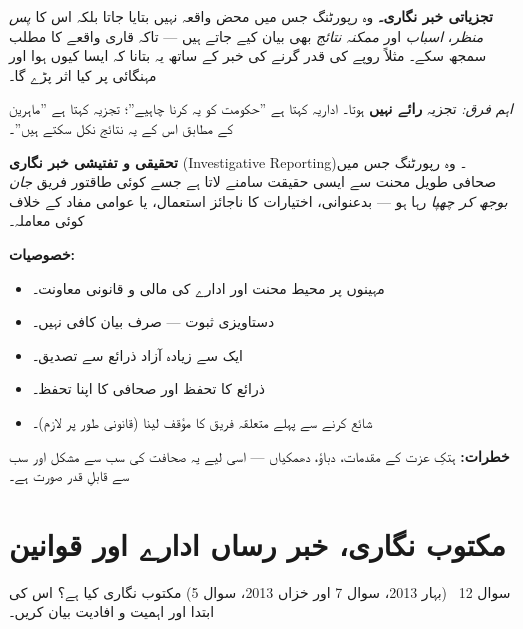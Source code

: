 \begin{hal}
\textbf{تجزیاتی خبر نگاری۔} وہ رپورٹنگ جس میں محض واقعہ نہیں بتایا جاتا بلکہ
اس کا \emph{پس منظر}، \emph{اسباب} اور \emph{ممکنہ نتائج} بھی بیان کیے جاتے
ہیں --- تاکہ قاری واقعے کا مطلب سمجھ سکے۔ مثلاً روپے کی قدر گرنے کی خبر کے
ساتھ یہ بتانا کہ ایسا کیوں ہوا اور مہنگائی پر کیا اثر پڑے گا۔

\smallskip
\emph{اہم فرق:} تجزیہ \textbf{رائے نہیں} ہوتا۔ اداریہ کہتا ہے ''حکومت کو یہ
کرنا چاہیے''؛ تجزیہ کہتا ہے ''ماہرین کے مطابق اس کے یہ نتائج نکل سکتے ہیں''۔

\medskip
\textbf{تحقیقی و تفتیشی خبر نگاری} (\textenglish{Investigative Reporting})۔
وہ رپورٹنگ جس میں صحافی طویل محنت سے ایسی حقیقت سامنے لاتا ہے جسے کوئی طاقتور
فریق \emph{جان بوجھ کر چھپا} رہا ہو --- بدعنوانی، اختیارات کا ناجائز استعمال،
یا عوامی مفاد کے خلاف کوئی معاملہ۔

\smallskip
\textbf{خصوصیات:}
\begin{itemize}\setlength{\itemsep}{1pt}
  \item مہینوں پر محیط محنت اور ادارے کی مالی و قانونی معاونت۔
  \item دستاویزی ثبوت --- صرف بیان کافی نہیں۔
  \item ایک سے زیادہ آزاد ذرائع سے تصدیق۔
  \item ذرائع کا تحفظ اور صحافی کا اپنا تحفظ۔
  \item شائع کرنے سے پہلے متعلقہ فریق کا مؤقف لینا (قانونی طور پر لازم)۔
\end{itemize}

\smallskip
\textbf{خطرات:} ہتکِ عزت کے مقدمات، دباؤ، دھمکیاں --- اسی لیے یہ صحافت کی سب
سے مشکل اور سب سے قابلِ قدر صورت ہے۔

\end{hal}

\section*{مکتوب نگاری، خبر رساں ادارے اور قوانین}

\begin{sawal}{سوال \textenglish{12} \ \textnormal{\small(بہار \textenglish{2013}، سوال \textenglish{7} اور خزاں \textenglish{2013}، سوال \textenglish{5})}}
مکتوب نگاری کیا ہے؟ اس کی ابتدا اور اہمیت و افادیت بیان کریں۔
\end{sawal}


